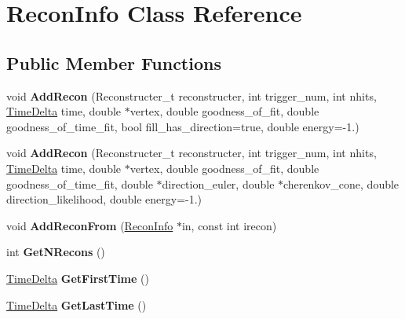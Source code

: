 \hypertarget{classReconInfo}{\section{Recon\-Info Class Reference}
\label{classReconInfo}
}
\subsection*{Public Member Functions}
\begin{DoxyCompactItemize}
\item 
\hypertarget{classReconInfo_af15bf0a0673c3ba6a18423e0357bd95b}{void {\bfseries Add\-Recon} (Reconstructer\-\_\-t reconstructer, int trigger\-\_\-num, int nhits, \hyperlink{classTimeDelta}{Time\-Delta} time, double $\ast$vertex, double goodness\-\_\-of\-\_\-fit, double goodness\-\_\-of\-\_\-time\-\_\-fit, bool fill\-\_\-has\-\_\-direction=true, double energy=-\/1.)}\label{classReconInfo_af15bf0a0673c3ba6a18423e0357bd95b}

\item 
\hypertarget{classReconInfo_acf71ac70ce0587d31d3040d35bf50b51}{void {\bfseries Add\-Recon} (Reconstructer\-\_\-t reconstructer, int trigger\-\_\-num, int nhits, \hyperlink{classTimeDelta}{Time\-Delta} time, double $\ast$vertex, double goodness\-\_\-of\-\_\-fit, double goodness\-\_\-of\-\_\-time\-\_\-fit, double $\ast$direction\-\_\-euler, double $\ast$cherenkov\-\_\-cone, double direction\-\_\-likelihood, double energy=-\/1.)}\label{classReconInfo_acf71ac70ce0587d31d3040d35bf50b51}

\item 
\hypertarget{classReconInfo_a96c16b9d66349d7eed2e4ada1c40525c}{void {\bfseries Add\-Recon\-From} (\hyperlink{classReconInfo}{Recon\-Info} $\ast$in, const int irecon)}\label{classReconInfo_a96c16b9d66349d7eed2e4ada1c40525c}

\item 
\hypertarget{classReconInfo_a2a9e7b5d70ab362de7d34217d15310dc}{int {\bfseries Get\-N\-Recons} ()}\label{classReconInfo_a2a9e7b5d70ab362de7d34217d15310dc}

\item 
\hypertarget{classReconInfo_ab515ad33a974ea715d0b4cb5edf101f9}{\hyperlink{classTimeDelta}{Time\-Delta} {\bfseries Get\-First\-Time} ()}\label{classReconInfo_ab515ad33a974ea715d0b4cb5edf101f9}

\item 
\hypertarget{classReconInfo_ac9a0283e1c4a62135793c256d48bf99d}{\hyperlink{classTimeDelta}{Time\-Delta} {\bfseries Get\-Last\-Time} ()}\label{classReconInfo_ac9a0283e1c4a62135793c256d48bf99d}


\end{DoxyCompactItemize}
